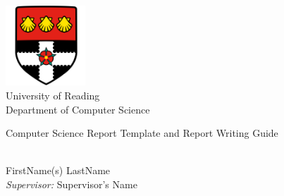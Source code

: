 \documentclass[a4paper,11pt,oneside]{book}
\begin{document}
    
    \frontmatter
    
    \begin{titlepage}      
        \begin{center}
            \includegraphics[width=3cm]{figures/uorlogo.png}\\[0.5cm]
            {\LARGE University of Reading\\[0.5cm]
            Department of Computer Science}\\[2cm]
			
            \linespread{1.2}\huge {
                Computer Science Report Template and Report Writing Guide
            
            }
            \linespread{1}~\\[2cm]
            {\Large 
                FirstName(s) LastName
            }\\[1cm] 
            

            {\large 
                \emph{Supervisor:} Supervisor's Name}\\[1cm] %
            

\end{center}
\end{titlepage}
\end{document}
